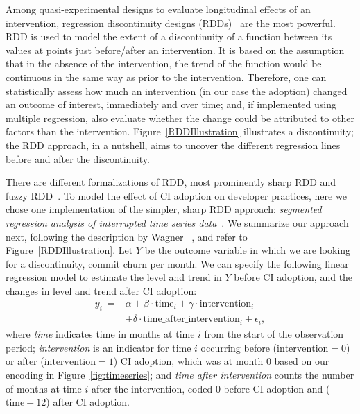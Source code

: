 Among quasi-experimental designs to evaluate longitudinal effects of an 
intervention, regression discontinuity designs (RDDs)~\cite{cook1979quasi} 
are the most powerful.
RDD is used to model the extent of a discontinuity of a function between its 
values at points just before/after an intervention. 
It is based on the assumption that in the absence of the intervention, the 
trend of the function would be continuous in the same way as prior to the 
intervention.
Therefore, one can statistically assess how much an intervention 
(in our case the \Tvi adoption) changed an outcome of interest,  
immediately and over time; and, if implemented using multiple regression, 
also evaluate whether the change could be attributed to other 
factors than the intervention.
Figure~\ref{RDDIllustration} illustrates a discontinuity; the RDD approach, 
in a nutshell, aims to uncover the different regression lines before and after 
the discontinuity.


There are different formalizations of RDD, most prominently 
sharp RDD and fuzzy RDD~\cite{imbens2008regression}.
To model the effect of CI adoption on developer practices, here we chose one 
implementation of the simpler, sharp RDD approach: \emph{segmented regression 
analysis of interrupted time series data}~\cite{wagner2002segmented}.
We summarize our approach next, following the description by Wagner 
\etal~\cite{wagner2002segmented}, and refer to Figure~\ref{RDDIllustration}.
Let $Y$ be the outcome variable in which we are looking for a discontinuity, 
\eg commit churn per month.
We can specify the following linear regression model to estimate the level
and trend in $Y$ before CI adoption, and the changes in level and trend
after CI adoption:
\begin{align}
y_i \ = &\alpha + \beta \cdot \text{time}_i + \gamma \cdot \text{intervention}_i \nonumber \\
	&+ \delta \cdot \text{time\_after\_intervention}_i + \epsilon_i, \nonumber
\end{align}
where \emph{time} indicates time in months at 
time $i$ from the start of the observation period;
\emph{intervention} is an indicator for time $i$ occurring before 
($\text{intervention} = 0$) or after ($\text{intervention} = 1$) CI adoption, which 
was at month 0 based on our encoding in Figure~\ref{fig:timeseries};
and \emph{time after intervention} counts the number 
of months at time $i$ after the intervention, coded 0 before CI adoption and 
($\text{time} - 12$) after CI adoption.

